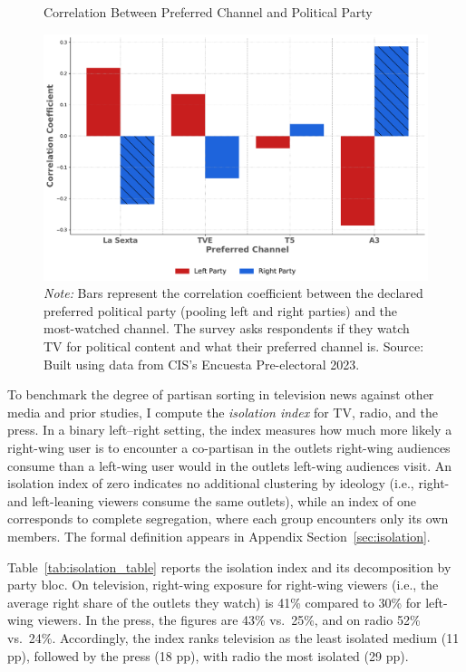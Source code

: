 \documentclass[12pt]{article}
\begin{document}
	
	\begin{figure}[!htbp]
		\centering
		\caption{Correlation Between Preferred Channel and Political Party}
		\includegraphics[width=120mm]{figures/corr_party_channel3}
		\caption*{\small \textit{Note:} Bars represent the correlation coefficient between the declared preferred political party (pooling left and right parties) and the most-watched channel. The survey asks respondents if they watch TV for political content  and what their preferred channel is. Source: Built using data from CIS's Encuesta Pre-electoral 2023.}
		\label{fig:opinion}
	\end{figure}
	
	

	
	
	
	To benchmark the degree of partisan sorting in television news against other media and prior studies, I compute the \emph{isolation index} \citep{gentzkow_isolation} for TV, radio, and the press. In a binary left–right setting, the index measures how much more likely a right-wing user is to encounter a co-partisan in the outlets right-wing audiences consume than a left-wing user would in the outlets left-wing audiences visit. An isolation index of zero indicates no additional clustering by ideology (i.e., right- and left-leaning viewers consume the same outlets), while an index of one corresponds to complete segregation, where each group encounters only its own members.%
	The formal definition appears in Appendix Section~\ref{sec:isolation}. 
	
	Table~\ref{tab:isolation_table} reports the isolation index and its decomposition by party bloc. On television, right-wing exposure for right-wing viewers (i.e., the average right share of the outlets they watch) is 41\% compared to 30\% for left-wing viewers. 
	In the press, the figures are 43\% vs.\ 25\%, and on radio 52\% vs.\ 24\%.
	Accordingly, the index ranks television as the least isolated medium (11 pp), followed by the press (18 pp), with radio the most isolated (29 pp).
	
\end{document}
